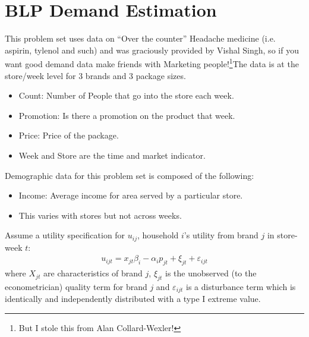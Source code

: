 \documentclass[11pt,letterpaper]{article}
\begin{document}
\section*{BLP Demand Estimation}
This problem set uses data on ``Over the counter'' Headache medicine (i.e.
aspirin, tylenol and such) and was graciously provided by Vishal Singh, so if
you want good demand data make friends with Marketing people!\footnote{But I stole this from Alan Collard-Wexler!}The data is at the store/week level for 3 brands and 3 package sizes.
\begin{itemize}
\item Count: Number of People that go into the store each week. 
\item Promotion: Is there a promotion on the product that week. 
\item Price: Price of the package.
\item Week and Store are the time and market indicator.
\end{itemize}

Demographic data for this problem set is composed of the following:
\begin{itemize}
\item Income: Average income for area served by a particular store.
\item This varies with stores but not across weeks.
\end{itemize}

Assume a utility specification for $u_{ij}$, household $i$'s utility from brand $j$ in store-week $t$:
\begin{eqnarray*}
u_{ijt}  = x_{jt} \beta_i - \alpha_i p_{jt} + \xi_{jt} + \varepsilon_{ijt}
\end{eqnarray*}
where $X_{jt}$ are characteristics of brand $j$, $\xi_{jt}$ is the unobserved (to the econometrician) quality term for brand $j$ and $\varepsilon_{ijt}$ is a disturbance term which is identically and independently distributed with a type I extreme value.
\end{document}
